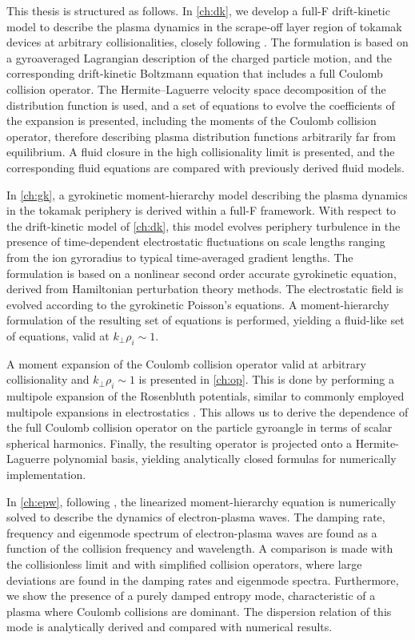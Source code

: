 This thesis is structured as follows.
%
In \cref{ch:dk}, we develop a full-F drift-kinetic model to describe the plasma dynamics in the scrape-off layer region of tokamak devices at arbitrary collisionalities, closely following \citep{Jorge2017}.
%
The formulation is based on a gyroaveraged Lagrangian description of the charged particle motion, and the corresponding drift-kinetic Boltzmann equation that includes a full Coulomb collision operator.
%
The Hermite–Laguerre velocity space decomposition of the distribution function is used, and a set of equations to evolve the coefficients of the expansion is presented, including the moments of the Coulomb collision operator, therefore describing plasma distribution functions arbitrarily far from equilibrium.
%
A fluid closure in the high collisionality limit is presented, and the corresponding fluid equations are compared with previously derived fluid models.

In \cref{ch:gk}, a gyrokinetic moment-hierarchy model describing the plasma dynamics in the tokamak periphery is derived within a full-F framework.
%
With respect to the drift-kinetic model of \cref{ch:dk}, this model evolves periphery turbulence in the presence of time-dependent electrostatic fluctuations on scale lengths ranging from the ion gyroradius to typical time-averaged gradient lengths.
%
The formulation is based on a nonlinear second order accurate gyrokinetic equation, derived from Hamiltonian perturbation theory methods.
%
The electrostatic field is evolved according to the gyrokinetic Poisson's equations.
%
A moment-hierarchy formulation of the resulting set of equations is performed, yielding a fluid-like set of equations, valid at $k_\perp \rho_i \sim 1$.

A moment expansion of the Coulomb collision operator valid at arbitrary collisionality and $k_\perp \rho_i \sim 1$ is presented in \cref{ch:op}.
%
This is done by performing a multipole expansion of the Rosenbluth potentials, similar to commonly employed multipole expansions in electrostatics \citep{Jackson1999}.
%
This allows us to derive the dependence of the full Coulomb collision operator on the particle gyroangle in terms of scalar spherical harmonics.
%
Finally, the resulting operator is projected onto a Hermite-Laguerre polynomial basis, yielding analytically closed formulas for numerically implementation.

In \cref{ch:epw}, following \citep{Jorge2018a}, the linearized moment-hierarchy equation is numerically solved to describe the dynamics of electron-plasma waves.
%
The damping rate, frequency and eigenmode spectrum of electron-plasma waves are found as a function of the collision frequency and wavelength.
%
A comparison is made with the collisionless limit and with simplified collision operators, where large deviations are found in the damping rates and eigenmode spectra.
%
Furthermore, we show the presence of a purely damped entropy mode, characteristic of a plasma where Coulomb collisions are dominant.
%
The dispersion relation of this mode is analytically derived and compared with numerical results.

